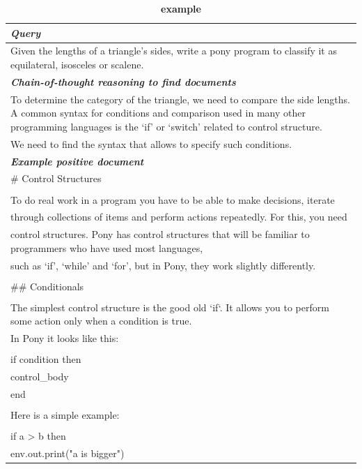 \begin{table}[ht]
\caption{\textbf{\pony example}}
\centering
\begin{tabular}{p{13cm}}
\toprule
\textit{\textbf{Query}} \\
\midrule
     Given the lengths of a triangle's sides, write a pony program to classify it as equilateral, isosceles or scalene.
 \\
\midrule
\textit{\textbf{Chain-of-thought reasoning to find documents}} \\
\midrule
To determine the category of the triangle, we need to compare the side lengths. A common syntax for conditions and comparison used in many other programming languages is the `if' or `switch' related to control structure. \\
We need to find the syntax that allows to specify such conditions. \\
\midrule
\textit{\textbf{Example positive document}} \\
\midrule
\# Control Structures \\
\\
To do real work in a program you have to be able to make decisions, iterate \\ through collections of items and perform actions repeatedly. For this, you need \\ control structures. Pony has control structures that will be familiar to programmers who have used most languages, \\
such as `if', `while' and `for', but in Pony, they work slightly differently. \\
\\
\#\# Conditionals \\
\\
The simplest control structure is the good old `if`. It allows you to perform some action only when a condition is true. \\
In Pony it looks like this: \\
\\
if condition then  \\
  control\_body \\
end \\
\\
Here is a simple example: \\
\\
if a > b then \\
  env.out.print("a is bigger") \\

\end{tabular}
\end{table}
